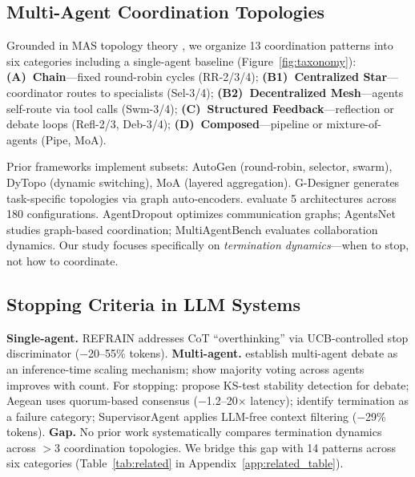 \documentclass{article}
\begin{document}
\subsection{Multi-Agent Coordination Topologies}
\vspace{-1mm}

Grounded in MAS topology theory \citep{masterman2025landscape}, we organize 13 coordination patterns into six categories including a single-agent baseline (Figure~\ref{fig:taxonomy}):
\textbf{(A)~Chain}---fixed round-robin cycles (RR-2/3/4);
\textbf{(B1)~Centralized Star}---coordinator routes to specialists (Sel-3/4);
\textbf{(B2)~Decentralized Mesh}---agents self-route via tool calls (Swm-3/4);
\textbf{(C)~Structured Feedback}---reflection or debate loops (Refl-2/3, Deb-3/4);
\textbf{(D)~Composed}---pipeline or mixture-of-agents (Pipe, MoA).

Prior frameworks implement subsets: AutoGen \citep{wu2023autogen} (round-robin, selector, swarm), DyTopo \citep{lu2026dytopo} (dynamic switching), MoA \citep{li2025moa} (layered aggregation). G-Designer \citep{zhang2025gdesigner} generates task-specific topologies via graph auto-encoders. \citet{xiong2025scaling} evaluate 5 architectures across 180 configurations. AgentDropout \citep{wang2025agentdropout} optimizes communication graphs; AgentsNet \citep{grotschla2025agentsnet} studies graph-based coordination; MultiAgentBench \citep{zhu2025multiagentbench} evaluates collaboration dynamics. Our study focuses specifically on \emph{termination dynamics}---when to stop, not how to coordinate.

\subsection{Stopping Criteria in LLM Systems}
\vspace{-1mm}

\textbf{Single-agent.} REFRAIN \citep{sun2025refrain} addresses CoT ``overthinking'' via UCB-controlled stop discriminator ($-$20--55\% tokens). \textbf{Multi-agent.} \citet{du2024debate} establish multi-agent debate as an inference-time scaling mechanism; \citet{chen2024more} show majority voting across agents improves with count. For stopping: \citet{hu2025when} propose KS-test stability detection for debate; Aegean \citep{ruan2025reaching} uses quorum-based consensus ($-$1.2--20$\times$ latency); \citet{cemri2025why} identify termination as a failure category; SupervisorAgent \citep{lin2025stop} applies LLM-free context filtering ($-$29\% tokens). \textbf{Gap.} No prior work systematically compares termination dynamics across $>$3 coordination topologies. We bridge this gap with 14 patterns across six categories (Table~\ref{tab:related} in Appendix~\ref{app:related_table}).
\end{document}
